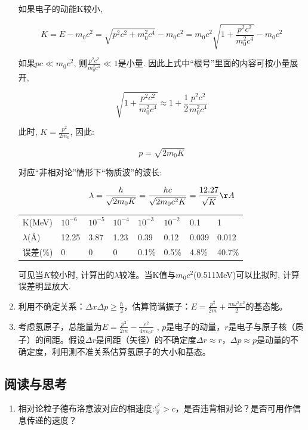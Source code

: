 \begin{enumerate}
如果电子的动能K较小,

\begin{equation*}
K = E - m_0 c^2 = \sqrt{p^2 c^2 + m_0^2 c^4 } - m_0 c^2 = m_0c^2
\sqrt{1 + \frac{p^2 c^2}{m_0^2 c^4}} -m_0 c^2
\end{equation*}

如果$pc \ll m_0 c^2$, 则$\frac{p^2 c^2}{m_0^2 c^4} \ll 1$是小量.
因此上式中``根号''里面的内容可按小量展开,

\begin{equation*}
\sqrt{1 + \frac{p^2 c^2}{m_0^2 c^4}} \approx 1 +
\frac{1}{2}\frac{p^2 c^2}{m_0^2 c^4}
\end{equation*}


此时, $K = \frac{p^2}{2 m_0}$, 因此:

\begin{equation*}
p = \sqrt{2 m_0 K}
\end{equation*}

对应``非相对论''情形下``物质波''的波长:

\begin{equation*}
\lambda = \frac{h}{\sqrt{2 m_0 K}} = \frac{hc}{\sqrt{2 m_0c^2 K}} =
\frac{12.27}{\sqrt K} {\AA}
\end{equation*}



\begin{tabular}{|l|l|l|l|l|l|l|l|}
  \hline
  K(MeV) & $10^{-6}$ & $10^{-5}$ & $10^{-4}$ & $10^{-3}$ & $10^{-2}$ & 0.1 & 1 \\
  $\lambda$(\AA) & 12.25 & 3.87 & 1.23 & 0.39 & 0.12 & 0.039 & 0.012 \\
  误差(\%) & 0 & 0 & 0 & 0.1\% & 0.5\% & 4.8\% &
  40.7\% \\
  \hline
\end{tabular}


可见当$K$较小时, 计算出的$\lambda$较准。当K值与$m_0
c^2$(0.511MeV)可以比拟时, 计算误差明显放大.


  \item 利用不确定关系：$\Delta x\Delta p \geqslant \frac{\hbar }
{2}$，估算简谐振子：$E = \frac{{p^2 }} {{2m}} + \frac{{m\omega ^2
x^2 }} {2}$的基态能。
  \item 考虑氢原子，总能量为$E = \frac{{p^2 }}
{{2m}} - \frac{{e^2 }} {{4\pi \varepsilon _0 r}}$ ,
$p$是电子的动量，$r$是电子与原子核（质子）的间距。假设$\Delta
r$是间距（矢径）的不确定度$\Delta r \approx r$，$\Delta p \approx
p$是动量的不确定度，利用测不准关系估算氢原子的大小和基态。
\end{enumerate}


\subsection*{阅读与思考}

\begin{enumerate}
    \item 相对论粒子德布洛意波对应的相速度:$\frac{{c^2 }}{v} > c$，是否违背相对论？是否可用作信息传递的速度？



\end{enumerate}
